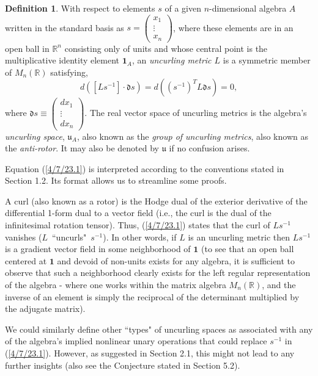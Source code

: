 \documentclass{amsart}
\numberwithin{equation}{section}
\theoremstyle{definition}
\newtheorem{definition}[theorem]{Definition}
\numberwithin{theorem}{section}
\begin{document}
   
     \begin{definition}\label{7/21/23.1} With respect to elements $s$ of a given $n$-dimensional algebra $A$ written in the standard basis as $s= \left(\begin{array}{ccc}
x_1   \\ 
\vdots \\
x_n   
\end{array}\right)$, where these elements are in an open ball in $\mathbb{R}^n$ consisting only of units and whose central point is the multiplicative identity element $\mathbf{1}_A$, an {\it uncurling metric $L$} is a symmetric member of $M_n(\mathbb{R})$  satisfying, \begin{equation}\label{4/7/23.1} d([Ls^{-1}]\cdot \mathfrak{d}s) = d\left((s^{-1})^T L \mathfrak{d}s\right) = 0, \end{equation} where $\mathfrak{d}s \equiv \left(\begin{array}{ccc}
dx_1   \\ 
\vdots \\
dx_n   
\end{array}\right)$.  The real vector space of uncurling metrics is the algebra's {\it uncurling space}, $\mathfrak{u}_A$, also known as the {\it group of uncurling metrics}, also known as the {\it anti-rotor}.  It may also be denoted by $\mathfrak{u}$ if no confusion arises.    \end{definition}

\bigskip

Equation (\ref{4/7/23.1}) is interpreted according to the conventions stated in Section 1.2.  Its format allows us to streamline some proofs.

 A curl (also known as a rotor) is the Hodge dual of the exterior derivative of the differential \mbox{1-form} dual to a vector field (i.e., the curl is the dual of the infinitesimal rotation tensor).  Thus,  (\ref{4/7/23.1}) states that the curl of $Ls^{-1}$ vanishes (\mbox{$L$ ``uncurls" $s^{-1}$}).    In other words, if $L$ is an uncurling metric then $Ls^{-1}$ is a gradient vector field in some neighborhood of $\mathbf{1}$ (to see that an open ball centered at $\mathbf{1}$ and devoid of non-units exists for any algebra, it is sufficient to observe that such a neighborhood clearly exists for the left regular representation of the algebra - where one works within the matrix algebra $ M_n(\mathbb{R})$, and the inverse of an element is simply the reciprocal of the determinant multiplied by the adjugate matrix).
 
 We could similarly define other ``types" of uncurling spaces as associated with any of the algebra's implied nonlinear unary operations that could replace $s^{-1}$ in (\ref{4/7/23.1}).  However, as suggested in Section 2.1, this might not lead to any further insights (also see the Conjecture stated in Section 5.2).  
 
\end{document}
